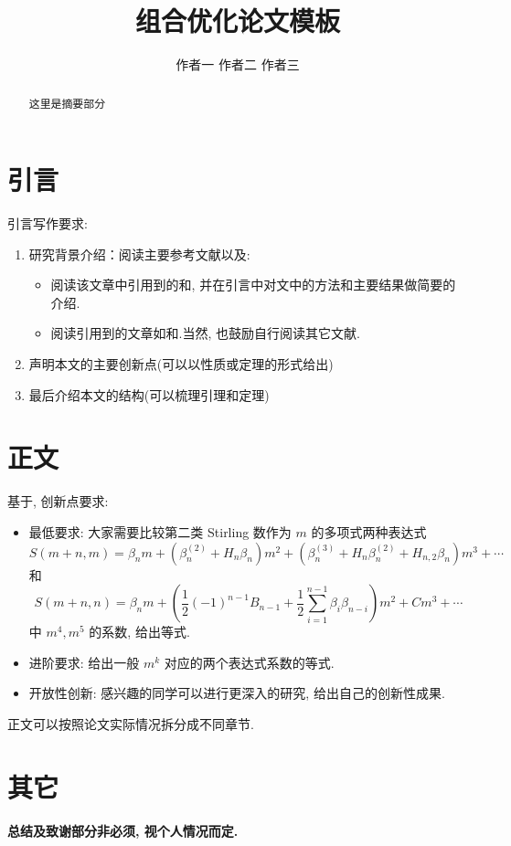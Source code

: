 \documentclass{CombPaper}
\begin{document}
\title{\heiti 组合优化论文模板}

\author{作者一 \quad 作者二 \quad 作者三}
\address{上海财经大学数学学院, 上海 200433}


\maketitle

\begin{abstract}
	这里是摘要部分
\end{abstract}

\section{引言}
引言写作要求:
\begin{enumerate}
	\item 研究背景介绍：阅读主要参考文献\cite{gessel2005miki}以及:
	\begin{itemize}
		\item 阅读该文章中引用到的\cite{miki1978relation}和\cite{dilcher1996sums}, 并在引言中对文中的方法和主要结果做简要的介绍.
		\item 阅读引用到\cite{gessel2005miki}的文章如\cite{fu2009symmetric}和\cite{dilcher2016general}.当然, 也鼓励自行阅读其它文献.
	\end{itemize}
	\item 声明本文的主要创新点(可以以性质或定理的形式给出)
	\item 最后介绍本文的结构(可以梳理引理和定理)
\end{enumerate}

\section{正文}
基于\cite{gessel2005miki}, 创新点要求:
\begin{itemize}
	\item 最低要求: 大家需要比较第二类 Stirling 数作为 $m$ 的多项式两种表达式 $$S(m+n, m)=\beta_{n} m+\left(\beta_{n}^{(2)}+H_{n} \beta_{n}\right) m^{2}+\left(\beta_{n}^{(3)}+H_{n} \beta_{n}^{(2)}+H_{n, 2} \beta_{n}\right) m^{3}+\cdots$$ 和 $$S(m+n, n)=\beta_{n} m+\left(\frac{1}{2}(-1)^{n-1} B_{n-1}+\frac{1}{2} \sum_{i=1}^{n-1} \beta_{i} \beta_{n-i}\right) m^{2}+C m^{3}+\cdots$$ 中 $m^4, m^5$ 的系数, 给出等式.
	\item 进阶要求: 给出一般 $m^k$ 对应的两个表达式系数的等式.
	\item 开放性创新: 感兴趣的同学可以进行更深入的研究, 给出自己的创新性成果. 
\end{itemize}

正文可以按照论文实际情况拆分成不同章节. 

\section{其它}
\textbf{总结及致谢部分非必须, 视个人情况而定.}



\end{document}
